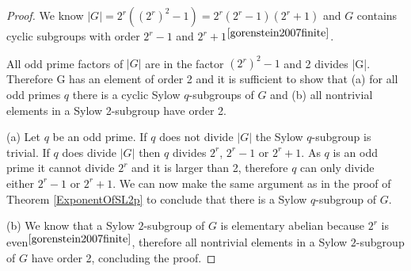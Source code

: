 \documentclass[a4paper,10pt]{article}
\begin{document}
\begin{proof}
	We know $|G| = 2^r((2^r)^2-1) = 2^r(2^r-1)(2^r+1)$ and $G$ contains cyclic subgroups with order $2^r-1$ and $2^r+1$$^{\cite[p. 40-42]{gorenstein2007finite}}$.

	All odd prime factors of $|G|$ are in the factor $(2^r)^2-1$ and 2 divides |G|. Therefore G has an element of order 2 and it is sufficient to show that (a) for all odd primes $q$ there is a cyclic Sylow $q$-subgroups of $G$ and (b) all nontrivial elements in a Sylow 2-subgroup have order 2.

	(a) Let $q$ be an odd prime. If $q$ does not divide $|G|$ the Sylow $q$-subgroup is trivial. If $q$ does divide $|G|$ then $q$ divides $2^r$, $2^r-1$ or $2^r+1$. As $q$ is an odd prime it cannot divide $2^r$ and it is larger than 2, therefore $q$ can only divide either $2^r-1$ or $2^r+1$. We can now make the same argument as in the proof of Theorem \ref{ExponentOfSL2p} to conclude that there is a Sylow $q$-subgroup of $G$.

	(b) We know that a Sylow $2$-subgroup of $G$ is elementary abelian because $2^r$ is even$^{\cite[p. 42]{gorenstein2007finite}}$, therefore all nontrivial elements in a Sylow $2$-subgroup of $G$ have order 2, concluding the proof.
\end{proof}




\end{document}
